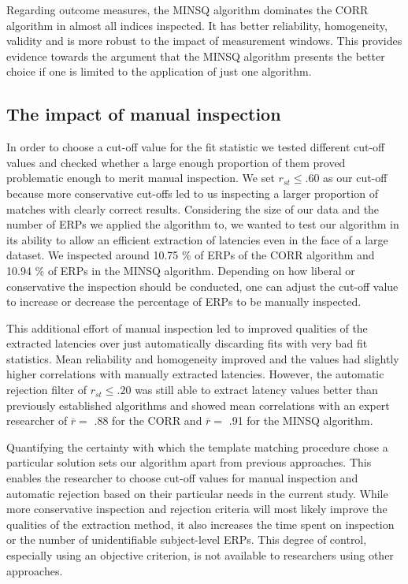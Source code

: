 \documentclass[
  man]{apa7}
\begin{document}
Regarding outcome measures, the MINSQ algorithm dominates the CORR algorithm in almost all indices inspected. It has better reliability, homogeneity, validity and is more robust to the impact of measurement windows. This provides evidence towards the argument that the MINSQ algorithm presents the better choice if one is limited to the application of just one algorithm.

\hypertarget{the-impact-of-manual-inspection}{%
\subsection{The impact of manual inspection}\label{the-impact-of-manual-inspection}}

In order to choose a cut-off value for the fit statistic we tested different cut-off values and checked whether a large enough proportion of them proved problematic enough to merit manual inspection. We set \(r_{st} \le .60\) as our cut-off because more conservative cut-offs led to us inspecting a larger proportion of matches with clearly correct results. Considering the size of our data and the number of ERPs we applied the algorithm to, we wanted to test our algorithm in its ability to allow an efficient extraction of latencies even in the face of a large dataset. We inspected around 10.75 \% of ERPs of the CORR algorithm and 10.94 \% of ERPs in the MINSQ algorithm. Depending on how liberal or conservative the inspection should be conducted, one can adjust the cut-off value to increase or decrease the percentage of ERPs to be manually inspected.

This additional effort of manual inspection led to improved qualities of the extracted latencies over just automatically discarding fits with very bad fit statistics. Mean reliability and homogeneity improved and the values had slightly higher correlations with manually extracted latencies. However, the automatic rejection filter of \(r_{st} \le .20\) was still able to extract latency values better than previously established algorithms and showed mean correlations with an expert researcher of \(\overline{r} =\) .88 for the CORR and \(\overline{r} =\) .91 for the MINSQ algorithm.

Quantifying the certainty with which the template matching procedure chose a particular solution sets our algorithm apart from previous approaches. This enables the researcher to choose cut-off values for manual inspection and automatic rejection based on their particular needs in the current study. While more conservative inspection and rejection criteria will most likely improve the qualities of the extraction method, it also increases the time spent on inspection or the number of unidentifiable subject-level ERPs. This degree of control, especially using an objective criterion, is not available to researchers using other approaches.
\end{document}
